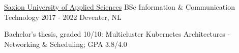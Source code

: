 
\begin{cventries}

  \cventry
    {\href{https://www.saxion.edu}{Saxion University of Applied Sciences}}
    {BSc Information \& Communication Technology}
    {2017 - 2022}
    {Deventer, NL}
    {
      \begin{cvitems}
        \item {Bachelor's thesis, graded 10/10: Multicluster Kubernetes Architectures - Networking \& Scheduling; GPA 3.8/4.0}
      \end{cvitems}
    }

\end{cventries}
